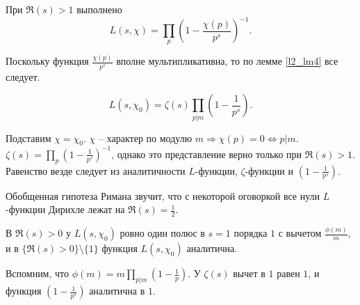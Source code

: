 \begin{lemma} \label{l7_Euler_ident}
	При $\Re(s) > 1$ выполнено
	$$L(s, \chi) = \prod_{p} \left(1 - \frac{\chi(p)}{p^s} \right)^{-1}.$$
\end{lemma}
\begin{pf}
	Поскольку функция $\displaystyle \frac{\chi(p)}{p^s}$ вполне мультипликативна, то по лемме \ref{l2_lm4} все следует.
\end{pf}

\begin{corollary} \label{l7_cor1}
	$$L(s, \chi_0) = \zeta(s) \prod_{p | m} \left( 1 - \frac{1}{p^s} \right).$$
\end{corollary}
\begin{pf}	
	Подставим $\chi = \chi_0$. $\chi$ -- характер по модулю $m \Rightarrow \chi(p) = 0 \Leftrightarrow p | m$. 
	$\displaystyle \zeta(s) = \prod_p  \left( 1 - \frac{1}{p^s} \right)^{-1}$, однако это представление верно только при 
	$\Re(s) > 1$. Равенство везде следует из аналитичности $L$-функции, $\zeta$-функции и $\displaystyle \left(1 - \frac{1}{p^s} \right)$. 
\end{pf}	

\begin{note}
	Обобщенная гипотеза Римана звучит, что с некоторой оговоркой все нули $L$-функции Дирихле лежат на 
	$\displaystyle \Re(s) = \frac{1}{2}$.
\end{note}

\begin{corollary} \label{l7_col2}
	В $\Re(s) > 0$ у $L(s, \chi_0)$ ровно один полюс в $s = 1$ порядка $1$ с вычетом $\displaystyle \frac{\phi(m)}{m}$, и в $\lbrace \Re(s) > 0 \rbrace \setminus \lbrace{1\rbrace}$ функция $L(s, \chi_0)$ аналитична.
\end{corollary}
\begin{pf}
	Вспомним, что $\displaystyle \phi(m) = m \prod_{p | m} \left( 1 - \frac{1}{p} \right)$. У $\zeta(s)$ вычет в $1$ равен $1$, и функция $\displaystyle \left(1 - \frac{1}{p^s} \right)$ аналитична в $1$.
\end{pf}

